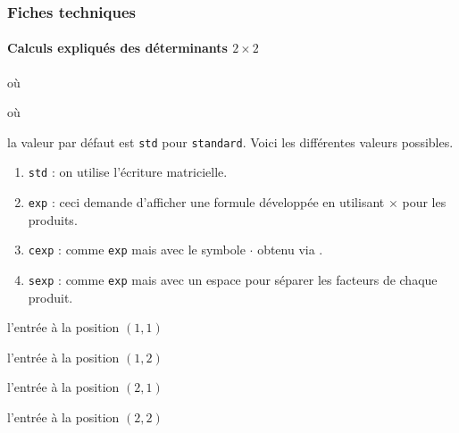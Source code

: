 \documentclass[12pt,a4paper]{article}
\begin{document}
\subsubsection{Fiches techniques}

\paragraph{\texorpdfstring{Calculs expliqués des déterminants $2 \times 2$}%
                          {Calculs expliqués des déterminants 3x3}}

  où \quad {}

  où \quad {}

\IDoption{} la valeur par défaut est \verb+std+ pour \verb+standard+. Voici les différentes valeurs possibles.
\begin{enumerate}
	\item \verb+std+ : on utilise l'écriture matricielle.

	\item \verb+exp+ : ceci demande d'afficher une formule développée en utilisant $\times$ pour les produits.

	\item \verb+cexp+ : comme \verb+exp+ mais avec le symbole $\cdot$ obtenu via .

	\item \verb+sexp+ : comme \verb+exp+ mais avec un espace pour séparer les facteurs de chaque produit.
\end{enumerate}

 l'entrée à la position $(1, 1)$

 l'entrée à la position $(1, 2)$

\extraspace

 l'entrée à la position $(2, 1)$

 l'entrée à la position $(2, 2)$                   
\end{document}
